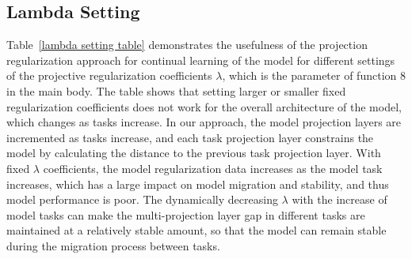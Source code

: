 \subsection{Lambda Setting}
Table~\ref{lambda setting table} demonstrates the usefulness of the projection regularization approach for continual learning of the model for different settings of the projective regularization coefficients $\lambda$, which is the parameter of function 8 in the main body. The table shows that setting larger or smaller fixed regularization coefficients does not work for the overall architecture of the model, which changes as tasks increase. In our approach, the model projection layers are incremented as tasks increase, and each task projection layer constrains the model by calculating the distance to the previous task projection layer. With fixed $\lambda$ coefficients, the model regularization data increases as the model task increases, which has a large impact on model migration and stability, and thus model performance is poor. The dynamically decreasing $\lambda$ with the increase of model tasks can make the multi-projection layer gap in different tasks are maintained at a relatively stable amount, so that the model can remain stable during the migration process between tasks.


\begin{table}
\renewcommand{\arraystretch}{1.1}
\caption{The comparison of different memory sizes in the model on various metrics demonstrates the effect of different memory sizes on the continual learning approach.}
\label{Memory Size table}
\end{table}


